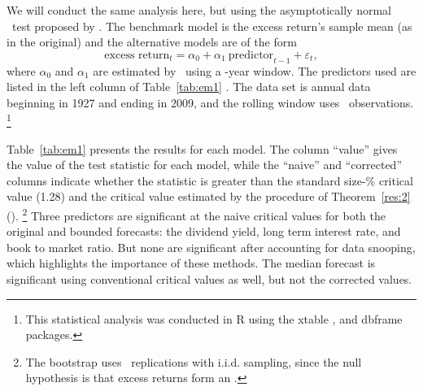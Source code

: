 \documentclass[12pt,fleqn]{article}
\begin{document}
We will conduct the same analysis here, but using the asymptotically
normal \mds\ test proposed by \cite{Cal:15}.  The benchmark model is
the excess return's sample mean (as in the original) and the
alternative models are of the form
\[
  \text{excess return}_{t} = \alpha_{0} +
  \alpha_{1}\ \text{predictor}_{t-1} + \varepsilon_{t},
\]
where $\alpha_{0}$ and $\alpha_{1}$ are estimated by \ols\ using a
\windowlength-year window. The predictors used are listed in the left
column of Table~\ref{tab:em1} \citep[see][for a detailed description
of the variables]{GoW:08}. The data set is annual data beginning in
1927 and ending in 2009, and the rolling window uses \windowlength\
observations.%
\footnote{This statistical analysis was conducted in R \citep{R} using
  the xtable \citep[version~1.6-0]{Dah:09}, and dbframe \citep[version
  0.2.7]{Cal:10b} packages.} %

Table~\ref{tab:em1} presents the results for each model.  The column
``value'' gives the value of the test statistic for each model, while
the ``naive'' and ``corrected'' columns indicate whether the statistic
is greater than the standard size-\bootsize\% critical value (1.28)
and the critical value estimated by the procedure of
Theorem~\ref{res:2} (\empiricalcriticalvalue).%
\footnote{The bootstrap
  uses \nboot\ replications with i.i.d. sampling, since the
  null hypothesis is that excess returns form an \mds.} %
Three predictors are
significant at the naive critical values for both the original and
bounded forecasts: the dividend yield, long term interest rate, and
book to market ratio.  But none are significant after accounting for
data snooping, which highlights the importance of these methods.  The
median forecast is significant using conventional critical values as
well, but not the corrected values.

\begin{table}[tb!]
  \centering
  \empiricaltable
\caption{Results from \oos\ comparison of equity premium prediction
  models; the benchmark is the recursive sample mean of the equity
  premium and each alternative model is a constant and single lag of
  the variable listed in the ``predictor'' column.  The dataset begins
  in 1927 and ends in 2009 and is annual data. The ``value'' column
  lists the value of this paper's \oos\ statistic, the ``naive''
  column indicates whether the statistic is significant at standard
  critical values, and the ``corrected'' column indicates significance
  using the critical values proposed in Theorem~\ref{res:2} that
  account for the number of models.  See Section~\ref{sec:3} for details.}
\label{tab:em1}
\end{table}
\end{document}
